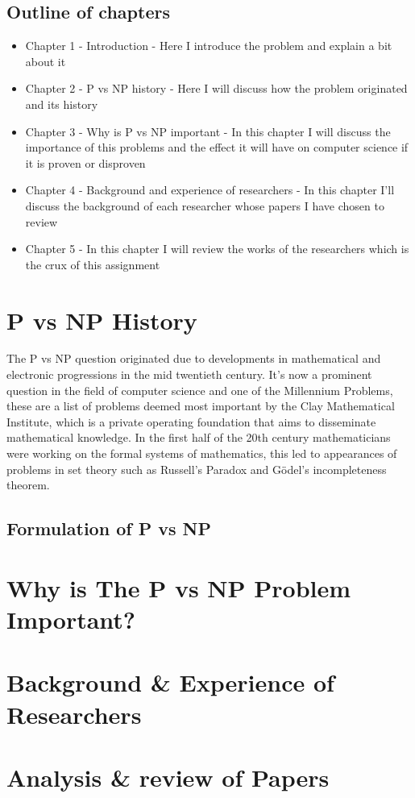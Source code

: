 \documentclass{report}
\begin{document}
\section{Outline of chapters}
\begin{itemize}
  \item Chapter 1 - Introduction - Here I introduce the problem and explain a bit
  about it
  \item  Chapter 2 - P vs NP history - Here I will discuss how the problem originated and its history
  \item Chapter 3 - Why is P vs NP important - In this chapter I will discuss the importance of this problems
  and the effect it will have on computer science if it is proven or disproven
  \item Chapter 4 - Background and experience of researchers - In this chapter I'll discuss the background of
  each researcher whose papers I have chosen to review
  \item Chapter 5 - In this chapter I will review the works of the researchers which is the crux of this assignment
\end{itemize}
\chapter{P vs NP History}
The P vs NP question originated due to developments in mathematical and electronic progressions in the mid twentieth century\cite{HistoryOfPVsNP}. It's now a prominent question in the field of computer science and one of the Millennium Problems\cite{Millennium}, these are a list of problems deemed most important by the Clay Mathematical Institute, which is a private operating foundation that aims to disseminate mathematical knowledge\cite{AboutMillennium}.  In the first half of the 20th century mathematicians were working on the formal systems of mathematics\cite{ResearchPaperFormalizeMathematics}, this led to appearances of problems in set theory such as Russell's Paradox\cite{RussellParadox} and Gödel's incompleteness theorem\cite{Godel}.
\section{Formulation of P vs NP}

\chapter{Why is The P vs NP Problem Important?}
\chapter{Background \& Experience of Researchers}
\chapter{Analysis \& review of Papers}



\end{document}
